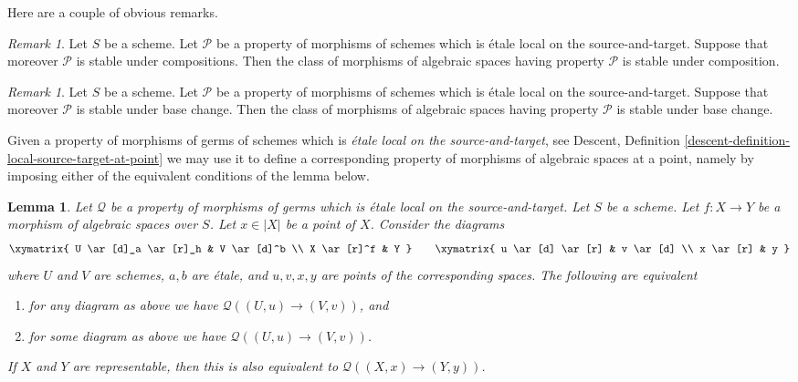 \documentclass{stacks-project}
\theoremstyle{plain}
\newtheorem{lemma}[subsection]{Lemma}
\theoremstyle{definition}
\theoremstyle{remark}
\newtheorem{remark}[subsection]{Remark}
\numberwithin{equation}{subsection}
\begin{document}
\noindent
Here are a couple of obvious remarks.

\begin{remark}
\label{remark-composition-P}
Let $S$ be a scheme. Let $\mathcal{P}$ be a property of morphisms of schemes
which is \'etale local on the source-and-target. Suppose that moreover
$\mathcal{P}$ is stable under compositions. Then the class of morphisms
of algebraic spaces having property $\mathcal{P}$ is stable under composition.
\end{remark}

\begin{remark}
\label{remark-base-change-P}
Let $S$ be a scheme. Let $\mathcal{P}$ be a property of morphisms of schemes
which is \'etale local on the source-and-target. Suppose that moreover
$\mathcal{P}$ is stable under base change. Then the class of morphisms
of algebraic spaces having property $\mathcal{P}$ is stable under base change.
\end{remark}

\noindent
Given a property of morphisms of germs of schemes which is {\it \'etale local
on the source-and-target}, see
Descent, Definition \ref{descent-definition-local-source-target-at-point}
we may use it to define a corresponding property of morphisms of
algebraic spaces at a point, namely by imposing either of
the equivalent conditions of the lemma below.

\begin{lemma}
\label{lemma-local-source-target-at-point}
Let $\mathcal{Q}$ be a property of morphisms of germs which is
\'etale local on the source-and-target.
Let $S$ be a scheme.
Let $f : X \to Y$ be a morphism of algebraic spaces over $S$.
Let $x \in |X|$ be a point of $X$.
Consider the diagrams
$$
\xymatrix{
U \ar[d]_a \ar[r]_h & V \ar[d]^b \\
X \ar[r]^f & Y
}
\quad\quad
\xymatrix{
u \ar[d] \ar[r] & v \ar[d] \\
x \ar[r] & y
}
$$
where $U$ and $V$ are schemes, $a, b$ are \'etale, and $u, v, x, y$
are points of the corresponding spaces.
The following are equivalent
\begin{enumerate}
\item for any diagram as above we have $\mathcal{Q}((U, u) \to (V, v))$, and
\item for some diagram as above we have $\mathcal{Q}((U, u) \to (V, v))$.
\end{enumerate}
If $X$ and $Y$ are representable, then this is also
equivalent to $\mathcal{Q}((X, x) \to (Y, y))$.
\end{lemma}
\end{document}
